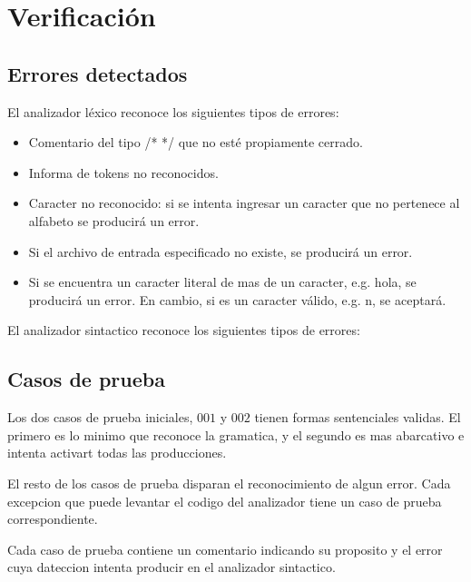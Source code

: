 \documentclass [a4paper,titlepage]{report}
\begin{document}
\section{Verificación}

\subsection{Errores detectados}

El analizador léxico reconoce los siguientes tipos de errores:

\begin{itemize}
\item Comentario del tipo /* */ que no esté propiamente cerrado.

\item Informa de tokens no reconocidos.

\item Caracter no reconocido: si se intenta ingresar un caracter que
no pertenece al alfabeto se producirá un error.

\item Si el archivo de entrada especificado no existe, se producirá un
error.

\item Si se encuentra un caracter literal de mas de un caracter, e.g.
\textquotesingle{}hola\textquotesingle{}, se producirá un error. En
cambio, si es un caracter válido, e.g.
\textquotesingle{}n\textquotesingle{}, se aceptará.
\end{itemize}

El analizador sintactico reconoce los siguientes tipos de errores:

\subsection{Casos de prueba}

Los dos casos de prueba iniciales, $001$ y $002$ tienen formas sentenciales validas.
El primero es lo minimo que reconoce la gramatica, y el segundo es mas
abarcativo e intenta activart todas las producciones.

El resto de los casos de prueba disparan el reconocimiento de algun error.
Cada excepcion que puede levantar el codigo del analizador tiene un caso de prueba correspondiente.

Cada caso de prueba contiene un comentario indicando su proposito y el error
cuya dateccion intenta producir en el analizador sintactico.
\end{document}
